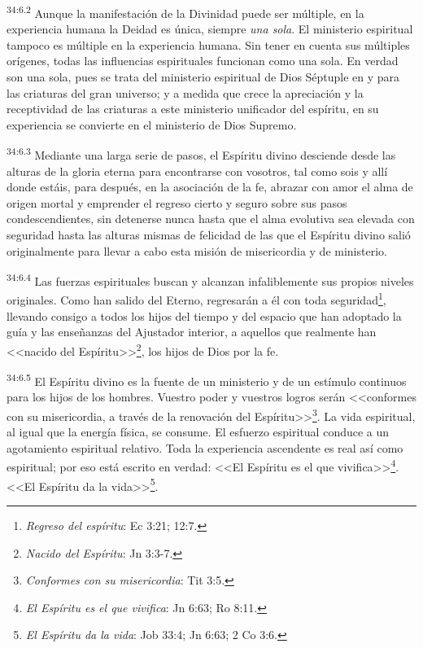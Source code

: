 \par
\textsuperscript{34:6.2} Aunque la manifestación de la Divinidad puede ser múltiple, en la experiencia humana la Deidad es única, siempre \textit{una sola}. El ministerio espiritual tampoco es múltiple en la experiencia humana. Sin tener en cuenta sus múltiples orígenes, todas las influencias espirituales funcionan como una sola. En verdad son una sola, pues se trata del ministerio espiritual de Dios Séptuple en y para las criaturas del gran universo; y a medida que crece la apreciación y la receptividad de las criaturas a este ministerio unificador del espíritu, en su experiencia se convierte en el ministerio de Dios Supremo.

\par
\textsuperscript{34:6.3} Mediante una larga serie de pasos, el Espíritu divino desciende desde las alturas de la gloria eterna para encontrarse con vosotros, tal como sois y allí donde estáis, para después, en la asociación de la fe, abrazar con amor el alma de origen mortal y emprender el regreso cierto y seguro sobre sus pasos condescendientes, sin detenerse nunca hasta que el alma evolutiva sea elevada con seguridad hasta las alturas mismas de felicidad de las que el Espíritu divino salió originalmente para llevar a cabo esta misión de misericordia y de ministerio.

\par
\textsuperscript{34:6.4} Las fuerzas espirituales buscan y alcanzan infaliblemente sus propios niveles originales. Como han salido del Eterno, regresarán a él con toda seguridad\footnote{\textit{Regreso del espíritu}: Ec 3:21; 12:7.}, llevando consigo a todos los hijos del tiempo y del espacio que han adoptado la guía y las enseñanzas del Ajustador interior, a aquellos que realmente han <<nacido del Espíritu>>\footnote{\textit{Nacido del Espíritu}: Jn 3:3-7.}, los hijos de Dios por la fe.

\par
\textsuperscript{34:6.5} El Espíritu divino es la fuente de un ministerio y de un estímulo continuos para los hijos de los hombres. Vuestro poder y vuestros logros serán <<conformes con su misericordia, a través de la renovación del Espíritu>>\footnote{\textit{Conformes con su misericordia}: Tit 3:5.}. La vida espiritual, al igual que la energía física, se consume. El esfuerzo espiritual conduce a un agotamiento espiritual relativo. Toda la experiencia ascendente es real así como espiritual; por eso está escrito en verdad: <<El Espíritu es el que vivifica>>\footnote{\textit{El Espíritu es el que vivifica}: Jn 6:63; Ro 8:11.}. <<El Espíritu da la vida>>\footnote{\textit{El Espíritu da la vida}: Job 33:4; Jn 6:63; 2 Co 3:6.}.

